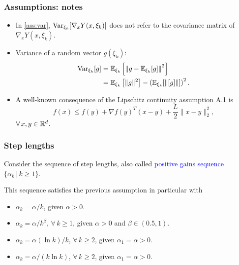 \documentclass[usepdftitle=false, aspectratio=169]{beamer}
\begin{document}
\begin{frame}
\frametitle{Assumptions: notes}

\begin{itemize}
\item 
In \ref{ass:var}, $\operatorname{Var}_{\xi_k} [\nabla_x Y(x, \xi_k)]$ does not refer to the covariance matrix of $\nabla_x Y(x,  \xi_k)$.
\item
Variance of a random vector $g(\xi_k)$:
\begin{align*}
\operatorname{Var}_{\xi_k} [g] &= {\mathbb{E}}_{\xi_k} \left[ \left \| g - {\mathbb{E}}_{\xi_k} [g] \right \|^2 \right] \\
& = {\mathbb{E}}_{\xi_k} \left[ \| g \|^2 \right] - \left( {\mathbb{E}}_{\xi_k} [ \| [g] \| ] \right)^2.
\end{align*}
\item
A well-known consequence of the Lipschitz continuity assumption A.1 is
$$
f(x) \leq f(y) + \nabla f(y)^T ( x - y ) + \frac{L}{2} \| x - y \|^2_2,
$$
$\forall\, x, y \in {\mathbb{R}}^d$.
\end{itemize}

\end{frame}

\begin{frame}
\frametitle{Step lengths}

Consider the sequence of step lengths, also called \textcolor{blue}{positive gains sequence} $\{ \alpha_k \,|\, k \geq 1 \}$.

\mbox{}

This sequence satisfies the previous assumption in particular with
\begin{itemize}
\item 
$\alpha_k = \alpha/k$, given $\alpha > 0$.
\item 
$\alpha_k = \alpha/k^{\beta}$, $\forall\, k \geq 1$, given $\alpha > 0$ and $\beta \in (0.5, 1)$.
\item
$\alpha_k = \alpha(\ln k)/k$, $\forall\, k \geq 2$, given $\alpha_1 = \alpha > 0$.
\item
$\alpha_k = \alpha/(k \ln k)$, $\forall\, k \geq 2$, given $\alpha_1 = \alpha > 0$.
\end{itemize}

\end{frame}
\end{document}

